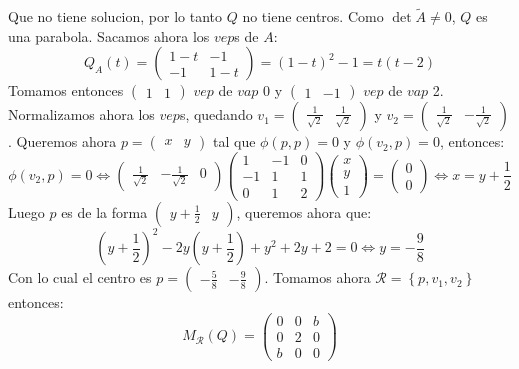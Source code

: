 \documentclass{article}
\begin{document}
\begin{enumerate}[label=(\Alph*)]
\begin{enumerate}[label=\roman*)]
\[\]
Que no tiene solucion, por lo tanto $Q$ no tiene centros. Como $\det\tilde{A} \neq 0$, $Q$ es una parabola. Sacamos ahora los $vep$s de $A$:
\[
Q_A(t) = \begin{pmatrix} 1-t & -1 \\ -1 & 1-t\end{pmatrix} = (1-t)^2-1 = t(t-2)
\]
Tomamos entonces $\begin{pmatrix} 1 & 1\end{pmatrix}$ $vep$ de $vap$ 0 y
$\begin{pmatrix} 1 & -1\end{pmatrix}$ $vep$ de $vap$ 2. Normalizamos ahora los $vep$s, quedando
$v_1 = \begin{pmatrix} \frac{1}{\sqrt{2}} & \frac{1}{\sqrt{2}} \end{pmatrix}$ y
$v_2 = \begin{pmatrix} \frac{1}{\sqrt{2}} & -\frac{1}{\sqrt{2}} \end{pmatrix}$. Queremos ahora
$p = \begin{pmatrix} x & y\end{pmatrix}$ tal que $\phi(p,p) = 0$ y $\phi(v_2,p) = 0$, entonces:
\[
\phi(v_2,p) = 0 \iff \begin{pmatrix} \frac{1}{\sqrt{2}} & -\frac{1}{\sqrt{2}} & 0\end{pmatrix}
\begin{pmatrix} 1 & -1 & 0 \\ -1 & 1 & 1 \\ 0 & 1 & 2 \end{pmatrix}\begin{pmatrix} x \\ y \\ 1 \end{pmatrix} =
\begin{pmatrix} 0 \\ 0\end{pmatrix}
\iff
x = y + \frac{1}{2}
\]
Luego $p$ es de la forma $\begin{pmatrix} y + \frac{1}{2} & y \end{pmatrix}$, queremos ahora que:
\[
\left( y + \frac{1}{2} \right)^2 - 2y\left(y+\frac{1}{2} \right) + y^2 + 2y +2 = 0
\iff
y = -\frac{9}{8}
\]
Con lo cual el centro es $p = \begin{pmatrix} -\frac{5}{8} & -\frac{9}{8} \end{pmatrix}$. Tomamos ahora
$\mathcal{R} = \left\{ p, v_1, v_2\right\}$ entonces:
\[
M_{\mathcal{R}}(Q) = \begin{pmatrix} 0 & 0 & b \\ 0 & 2 & 0 \\ b & 0 & 0 \end{pmatrix}
\]
\end{enumerate}
\end{enumerate}
\end{document}
